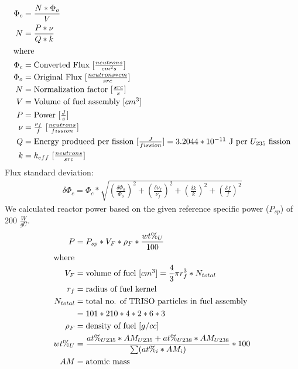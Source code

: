 \begin{align}
    \Phi_c &= \frac{N* \Phi_o}{V} \\
    N &= \frac{P*\nu}{Q*k} \\
    \intertext{where}
    \Phi_c &= \mbox{Converted Flux [$\frac{neutrons}{cm^2s}$]} \nonumber \\ 
    \Phi_o &= \mbox{Original Flux [$\frac{neutrons* cm}{src}$]} \nonumber \\
    N &= \mbox{Normalization factor [$\frac{src}{s}$]} \nonumber \\
    V &= \mbox{Volume of fuel assembly [$cm^3$]} \nonumber \\
    P &= \mbox{Power [$\frac{J}{s}$]} \nonumber \\
    \nu &= \mbox{$\frac{\nu_f}{f}$ [$\frac{neutrons}{fission}$]} \nonumber \\
    Q &= \mbox{Energy produced per fission [$\frac{J}{fission}$]} = \mbox{$3.2044*10^{-11}$ J per $U_{235}$ fission} \nonumber \\
    k &= \mbox{$k_{eff}$ [$\frac{neutrons}{src}$]} \nonumber 
\end{align}
Flux standard deviation: 
\begin{align}
    \delta \Phi_c = \Phi_c * 
    \sqrt{(\frac{\delta \Phi_o}{\Phi_o})^2+ (\frac{\delta \nu_f}{\nu_f})^2 
    + (\frac{\delta k}{k})^2 + (\frac{\delta f}{f})^2}
\end{align}
We calculated reactor power based on the given reference specific power 
($P_{sp}$) of 200 $\frac{W}{gU}$. 
\begin{align}
    P &= P_{sp} * V_F * \rho_F * \frac{wt\%_{U}}{100} \\
    \intertext{where}
    V_F &= \mbox{volume of fuel [$cm^3$]} = \frac{4}{3} \pi r_f^3 * N_{total} \nonumber \\
    r_f &= \mbox{radius of fuel kernel} \nonumber\\
    N_{total} &= \mbox{total no. of TRISO particles in fuel assembly} \nonumber\\ 
    &= 101 * 210 * 4 * 2 * 6 * 3 \nonumber\\
    \rho_F &= \mbox{density of fuel [$g/cc$]} \nonumber \\
    wt\%_{U} &= \frac{at\%_{U235} * AM_{U235} + at\%_{U238} * AM_{U238}}{\sum (at\%_i * AM_i)} * 100 \nonumber\\
    AM &= \mbox{atomic mass} \nonumber
\end{align}

